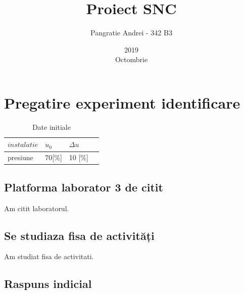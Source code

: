 \documentclass[12pt,english]{article}
\title{Proiect SNC}
\date{2019\\ Octombrie}
\author{Pangratie Andrei - 342 B3}
\begin{document}
\maketitle
\newpage

\tableofcontents
\newpage

\section {Pregatire experiment identificare }

\begin{table}[H]
  \centering
  \begin{tabular}{|l|l|l|l|}
    \hline
    $instalatie$ & $u_0$ & $\Delta u$ \\
    \hline
    presiune & 70[\%] & 10 [\%] \\
    \hline
  \end{tabular}
  \caption{Date initiale}
\end{table}

\subsection {Platforma laborator 3 de citit }
	Am citit laboratorul.

\subsection {Se studiaza fisa de activități }
	Am studiat fisa de activitati.

\subsection {Raspuns indicial }
\end{document}
